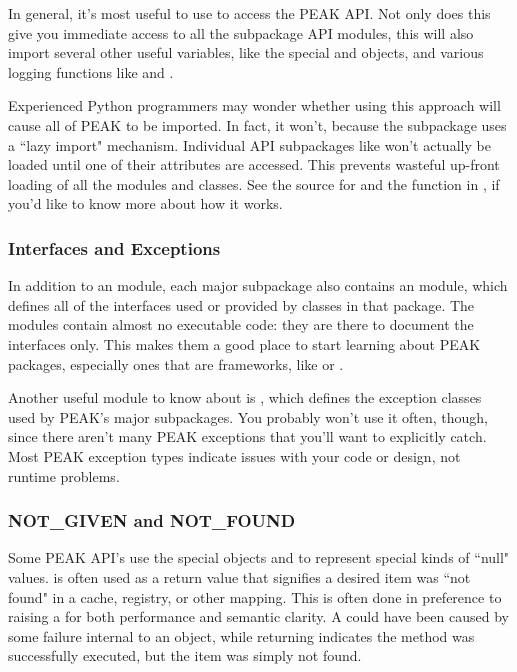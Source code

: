 In general, it's most useful to use  to access
the PEAK API.  Not only does this give you immediate access to all the
subpackage API modules, this will also import several other useful variables,
like the special  and  objects, and various
logging functions like  and .

Experienced Python programmers may wonder whether using this approach
will cause all of PEAK to be imported.  In fact, it won't, because the
 subpackage uses a ``lazy import" mechanism.  Individual API
subpackages like  won't actually be loaded until one of
their attributes are accessed.  This prevents wasteful up-front loading of all
the modules and classes.  See the source for  and 
the  function in , if you'd like
to know more about how it works.





\subsubsection{Interfaces and Exceptions}

In addition to an  module, each major subpackage also contains an
 module, which defines all of the interfaces used or provided
by classes in that package.  The  modules contain almost no 
executable code: they are there to document the interfaces only.  This makes
them a good place to start learning about PEAK packages, especially ones that
are frameworks, like  or .

Another useful module to know about is , which defines
the exception classes used by PEAK's major subpackages.  You probably won't use
it often, though, since there aren't many PEAK exceptions that you'll want to
explicitly catch.  Most PEAK exception types indicate issues with your code or
design, not runtime problems.

\subsubsection{NOT_GIVEN and NOT_FOUND}

Some PEAK API's use the special objects  and 
to represent special kinds of ``null" values.   is often
used as a return value that signifies a desired item was ``not found" in a
cache, registry, or other mapping.  This is often done in preference to 
raising a  for both performance and semantic clarity.  A
 could have been caused by some failure internal to an
object, while returning  indicates the method was successfully
executed, but the item was simply not found.

